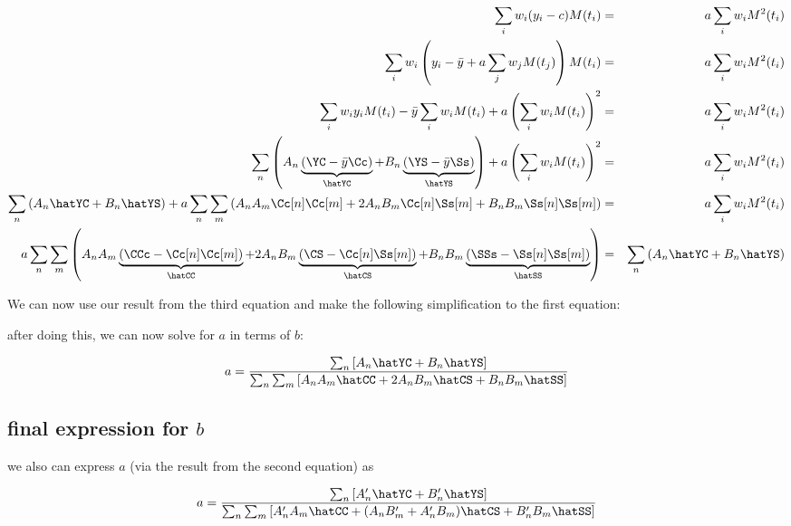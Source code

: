 \begin{eqnarray}
\sum_iw_i(y_i - c)M(t_i) &=& a\sum_i w_iM^2(t_i)\\
\sum_iw_i\left(y_i - \bar{y} + a\sum_jw_jM(t_j)\right)M(t_i) &=& a\sum_i w_i M^2(t_i)\\
\sum_iw_iy_iM(t_i) - \bar{y}\sum_iw_iM(t_i) + a\left(\sum_iw_iM(t_i)\right)^2 &=& a\sum_i w_i M^2(t_i)\\
\sum_n\left(A_n\underbrace{(\YC - \bar{y}\Cc)}_{\hatYC} + B_n\underbrace{(\YS - \bar{y}\Ss)}_{\hatYS}\right) + a\left(\sum_iw_iM(t_i)\right)^2&=& a\sum_i w_i M^2(t_i)\\
\sum_n\left(A_n\hatYC + B_n\hatYS\right) + a\sum_n\sum_m\left(A_nA_m\Cc[n]\Cc[m] + 2A_nB_m\Cc[n]\Ss[m] + B_nB_m\Ss[n]\Ss[m]\right) &=& a\sum_i w_i M^2(t_i)\\
a\sum_n\sum_m\left(A_nA_m\underbrace{(\CCc - \Cc[n]\Cc[m])}_{\hatCC} 
       + 2A_nB_m\underbrace{(\CS - \Cc[n]\Ss[m])}_{\hatCS} 
       + B_nB_m\underbrace{(\SSs - \Ss[n]\Ss[m])}_{\hatSS}\right)&=& \sum_n\left(A_n\hatYC + B_n\hatYS\right)
\end{eqnarray}



We can now use our result from the third equation and make the following simplification to the first equation:



after doing this, we can now solve for $a$ in terms of $b$:

\begin{equation}
a = \frac{\sum_n\left[A_n\hatYC + B_n\hatYS\right]}
{\sum_n\sum_m\left[A_nA_m\hatCC + 2A_nB_m\hatCS + B_nB_m\hatSS\right]}
\end{equation}

\subsection{final expression for $b$}
we also can express $a$ (via the result from the second equation) as

\begin{equation}
a = \frac{\sum_n\left[A_n'\hatYC + B_n'\hatYS\right]}
{\sum_n\sum_m\left[A_n'A_m\hatCC + (A_nB_m' + A_n'B_m)\hatCS + B_n'B_m\hatSS\right]}
\end{equation}

